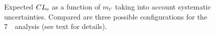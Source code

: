\begin{figure}[htb]\begin{center}
	\caption{Expected $CL_{\rm s}$ as a function of $m_{t'}$ taking into account systematic uncertainties.
Compared are three possible configurations for the 7~\tev\ analysis (see text for details).\label{fig:cls_study}}
\end{center}\end{figure}


